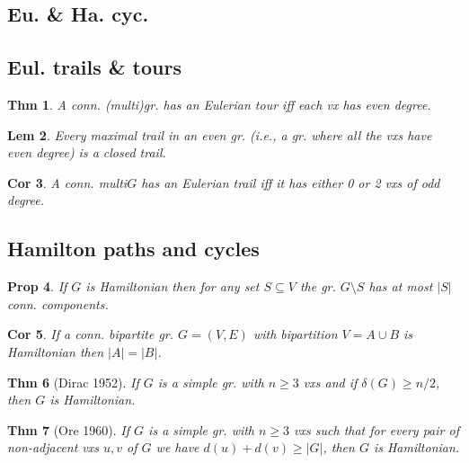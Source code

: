 \documentclass[11pt, fleqn, a4paper, landscape]{article}
\theoremstyle{plain} %
\newtheorem{thm}{Thm}
\newtheorem{lem}[thm]{Lem}
\newtheorem{pro}[thm]{Prop}
\newtheorem{cor}[thm]{Cor}
\theoremstyle{remark} %
\theoremstyle{definition} %
\newtheorem{defi}[thm]{Def}
\begin{document}
\begin{multicols}{5}
\section{Eu. \& Ha. cyc.}
\subsection{Eul. trails \& tours}
\addtocounter{thm}{2}

\addtocounter{thm}{2}
\begin{thm}
A conn. (multi)gr. has an Eulerian tour iff each vx has even degree.
\end{thm}

\begin{lem}
Every maximal trail in an even gr. (i.e., a gr. where all the vxs have even degree) is a closed trail.
\end{lem} 

\begin{cor}
A conn. multi$G$ has an Eulerian trail iff it has either 0 or 2 vxs of odd degree.
\end{cor}

\subsection{Hamilton paths and cycles}
\addtocounter{thm}{2}
\begin{pro}
If $G$ is Hamiltonian then for any set $S \subseteq V$ the gr. $G\setminus S$ has at most $|S|$ conn. components.
\end{pro}

\begin{cor}
If a conn. bipartite gr. $G = (V,E)$ with bipartition $V = A\cup B$ is Hamiltonian then $|A|=|B|$.
\end{cor}
\addtocounter{thm}{1}
\begin{thm}[Dirac 1952]
If $G$ is a simple gr. with $n \ge 3$ vxs and if $\delta(G) \ge n/2$, then $G$ is Hamiltonian.
\end{thm}
\addtocounter{thm}{1}
\begin{thm}[Ore 1960]
If $G$ is a simple gr. with $n\ge 3$ vxs such that for every pair of
non-adjacent vxs $u, v$ of $G$ we have $d(u) + d(v)\ge |G|$, then $G $ is Hamiltonian.
\end{thm}

\end{multicols}
\end{document}
